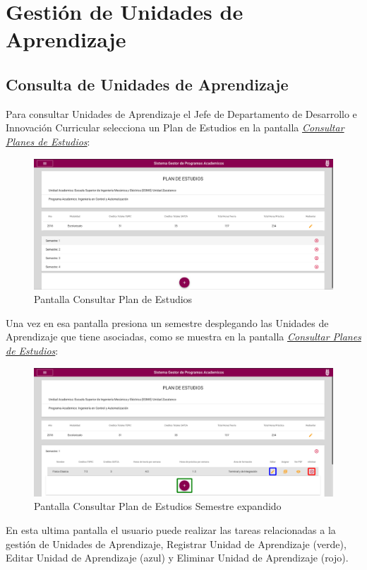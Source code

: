 \section{Gestión de Unidades de Aprendizaje}
    \subsection{Consulta de Unidades de Aprendizaje}
Para consultar Unidades de Aprendizaje el Jefe de Departamento de Desarrollo e Innovación Curricular selecciona un Plan de Estudios en la pantalla \hyperlink{consultarS}{\textit{Consultar Planes de Estudios}}:\\
\begin{figure}[H]
    \centering
    \hypertarget{consultarS}{\includegraphics[width=0.7\linewidth]{images/GUA/consultarS}}
    \caption{Pantalla Consultar Plan de Estudios}
    \label{consultarS}
\end{figure}
\newpage
Una vez en esa pantalla presiona un semestre desplegando las Unidades de Aprendizaje que tiene asociadas, como se muestra en la pantalla \hyperlink{consultarUA}{\textit{Consultar Planes de Estudios}}:\\
\begin{figure}[H]
    \centering
    \hypertarget{consultarUA}{\includegraphics[width=0.7\linewidth]{images/GUA/consultarUA}}
    \caption{Pantalla Consultar Plan de Estudios Semestre expandido}
    \label{consultarUA}
\end{figure}
En esta ultima pantalla el usuario puede realizar las tareas relacionadas a la gestión de Unidades de Aprendizaje, Registrar Unidad de Aprendizaje (verde), Editar Unidad de Aprendizaje (azul) y Eliminar Unidad de Aprendizaje (rojo).
\newpage
